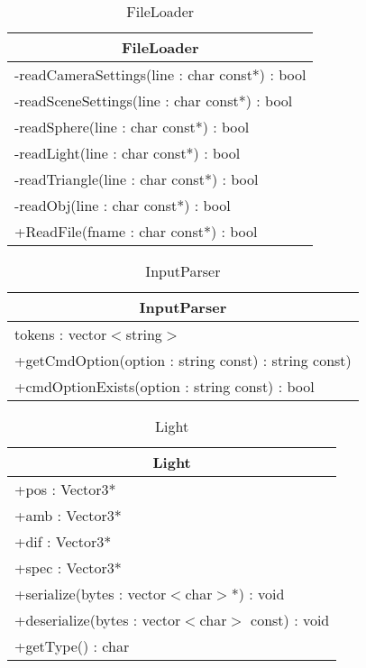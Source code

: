 \begin{longtable}{|p{16cm}|}
    \caption{FileLoader} \label{tab:FileLoader} \\ \hline
    \multicolumn{1}{|c|}{FileLoader} \\ \hline
    -readCameraSettings(line : char const*) : bool \\
    -readSceneSettings(line : char const*) : bool \\
    -readSphere(line : char const*) : bool \\
    -readLight(line : char const*) : bool \\
    -readTriangle(line : char const*) : bool \\
    -readObj(line : char const*) : bool \\
	+ReadFile(fname : char const*) : bool \\ \hline
\end{longtable}


\begin{longtable}{|p{16cm}|}
    \caption{InputParser} \label{tab:InputParser} \\ \hline
    \multicolumn{1}{|c|}{InputParser} \\ \hline
    tokens : vector$<$string$>$  \\ \hline
    +getCmdOption(option : string const) : string const) \\
    +cmdOptionExists(option : string const) : bool \\ \hline
\end{longtable}


\begin{longtable}{|p{16cm}|}
    \caption{Light} \label{tab:Light} \\ \hline
    \multicolumn{1}{|c|}{Light} \\ \hline
    +pos : Vector3* \\ 
    +amb : Vector3* \\
    +dif : Vector3* \\
    +spec : Vector3* \\
    \hline
	+serialize(bytes : vector$<$char$>$*) : void \\ 
	+deserialize(bytes : vector$<$char$>$ const) : void \\
	+getType() : char \\
	\hline
\end{longtable}


